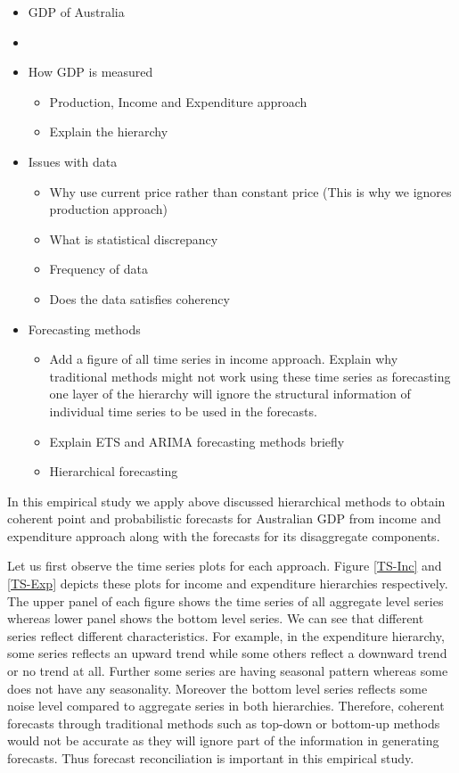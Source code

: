 \documentclass[graybox]{svmult}
\begin{document}
\begin{itemize}
	\item GDP of Australia
	\item []
	\item How GDP is measured
	\begin{itemize}
		\item Production, Income and Expenditure approach
		\item Explain the hierarchy
	\end{itemize}
	\item Issues with data
	\begin{itemize}
		\item Why use current price rather than constant price (This is why we ignores production approach)
		\item What is statistical discrepancy
		\item Frequency of data
		\item Does the data satisfies coherency
	\end{itemize}
	
	\item Forecasting methods
	\begin{itemize}
		\item Add a figure of all time series in income approach.
		Explain why traditional methods might not work using these time series as forecasting one layer of the hierarchy will ignore the structural information of individual time series to be used in the forecasts.
		
		\item Explain ETS and ARIMA forecasting methods briefly
		\item Hierarchical forecasting
	\end{itemize}
\end{itemize}

In this empirical study we apply above discussed hierarchical methods to obtain coherent point and probabilistic forecasts for Australian GDP from income and expenditure approach along with the forecasts for its disaggregate components.


Let us first observe the time series plots for each approach. Figure \ref{TS-Inc} and \ref{TS-Exp} depicts these plots for income and expenditure hierarchies respectively. The upper panel of each figure shows the time series of all aggregate level series whereas lower panel shows the bottom level series. We can see that different series reflect different characteristics. For example, in the expenditure hierarchy, some series reflects an upward trend while some others reflect a downward trend or no trend at all. Further some series are having seasonal pattern whereas some does not have any seasonality. Moreover the bottom level series reflects some noise level compared to aggregate series in both hierarchies. Therefore, coherent forecasts through traditional methods such as top-down or bottom-up methods would not be accurate as they will ignore part of the information in generating forecasts. Thus forecast reconciliation is important in this empirical study.
\end{document}
